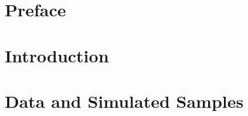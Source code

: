 \documentclass[UKenglish,texlive=2013]{\ATLASLATEXPATH atlasdoc}
\begin{document}
\maketitle
\clearpage

\tableofcontents

\clearpage

%

\section{Preface}
\label{sec:preface}

\section{Introduction}
\label{sec:intro}



% 

\section{Data and Simulated Samples}
\label{sec:samples}

\end{document}
